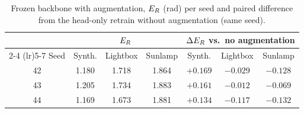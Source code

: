 \begin{table}[ht]
  \caption{Frozen backbone with augmentation, $E_{R}$ (rad) per seed and paired difference from the head-only retrain without augmentation (same seed).}
  \label{tab:frozenaug}
  \centering
  \small
  \setlength{\tabcolsep}{3pt}
  \begin{tabular}{c ccc ccc}
    \toprule
    & \multicolumn{3}{c}{$E_{R}$} & \multicolumn{3}{c}{$\Delta E_{R}$ vs.\ no augmentation} \\
    \cmidrule(lr){2-4} \cmidrule(lr){5-7}
    Seed & Synth. & Lightbox & Sunlamp & Synth. & Lightbox & Sunlamp \\
    \midrule
    42 & 1.180 & 1.718 & 1.864 & $+0.169$ & $-0.029$ & $-0.128$ \\
    43 & 1.205 & 1.734 & 1.883 & $+0.161$ & $-0.012$ & $-0.069$ \\
    44 & 1.169 & 1.673 & 1.881 & $+0.134$ & $-0.117$ & $-0.132$ \\
    \bottomrule
  \end{tabular}
\end{table}
